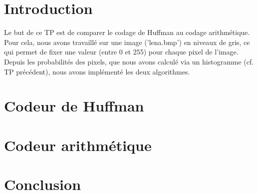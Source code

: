 \documentclass[a4paper, 12pt]{article}
\begin{document}






\clearpage

\section{Introduction}
Le but de ce TP est de comparer le codage de Huffman au codage arithmétique. Pour cela, nous avons travaillé sur une image ('lena.bmp') en niveaux de gris, ce qui permet de fixer une valeur (entre 0 et 255) pour chaque pixel de l'image. Depuis les probabilités des pixels, que nous avons calculé via un histogramme (cf. TP précédent), nous avons implémenté les deux algorithmes.

\section{Codeur de Huffman}

\section{Codeur arithmétique}

\section{Conclusion}
\end{document}
